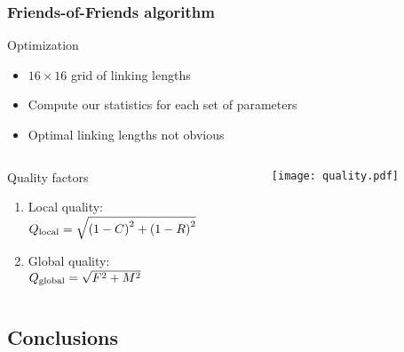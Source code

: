 \begin{frame}
    \frametitle{Friends-of-Friends algorithm}
    \begin{block}{Optimization}
        \begin{itemize}
            \item<1-> $16\times16$ grid of linking lengths
            \item<2-> Compute our statistics for each set of parameters
            \item<3-> Optimal linking lengths not obvious
        \end{itemize}
    \end{block}
\end{frame}


\begin{frame}
    \begin{columns}
        \begin{column}{0.55\textwidth}
            \begin{block}{Quality factors}
                \begin{enumerate}
                    \item<1-> Local quality: \\$Q_\mathrm{local}=\sqrt{%
                            {\left(1-C\right)}^2 + {\left(1-R\right)}^2
                        }$
                    \item<2-> Global quality: \\$Q_\mathrm{global}=\sqrt{%
                            F^2 + M^2
                        }$
                \end{enumerate}
            \end{block}
        \end{column}
        \begin{column}{0.45\textwidth}
            \centering
            \texttt{[image: quality.pdf]}
        \end{column}
    \end{columns}
\end{frame}

\subsection{Conclusions}


